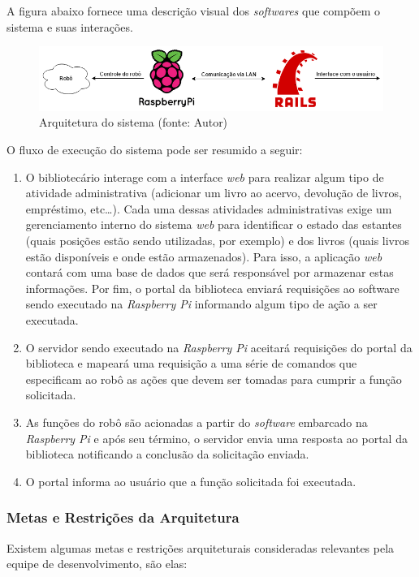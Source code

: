 A figura abaixo fornece uma descrição visual dos \textit{softwares} que compõem o sistema e suas interações.

\begin{figure}[!h]
\centering
\includegraphics[scale=0.50, angle = 360]{figuras/arquitetura_1}
\caption[]{Arquitetura do sistema (fonte: Autor)}
\label{Arquitetura do sistema}
\end{figure}
\FloatBarrier

O fluxo de execução do sistema pode ser resumido a seguir:

\begin{enumerate}
    \item O bibliotecário interage com a interface \textit{web} para realizar algum tipo de atividade administrativa (adicionar um livro ao acervo, devolução de livros, empréstimo, etc…). Cada uma dessas atividades administrativas exige um gerenciamento interno do sistema \textit{web} para identificar o estado das estantes (quais posições estão sendo utilizadas, por exemplo) e dos livros (quais livros estão disponíveis e onde estão armazenados). Para isso, a aplicação \textit{web} contará com uma base de dados que será responsável por armazenar estas informações. Por fim, o portal da biblioteca enviará requisições ao software sendo executado na \textit{Raspberry Pi} informando algum tipo de ação a ser executada.

    \item O servidor sendo executado na \textit{Raspberry Pi} aceitará requisições do portal da biblioteca e mapeará uma requisição a uma série de comandos que especificam ao robô as ações que devem ser tomadas para cumprir a função solicitada.

    \item As funções do robô são acionadas a partir do \textit{software} embarcado na \textit{Raspberry Pi} e após seu término, o servidor envia uma resposta ao portal da biblioteca notificando a conclusão da solicitação enviada.

    \item O portal informa ao usuário que a função solicitada foi executada.
\end{enumerate}

\subsubsection{Metas e Restrições da Arquitetura}
Existem algumas metas e restrições arquiteturais consideradas relevantes pela equipe de desenvolvimento, são elas:

